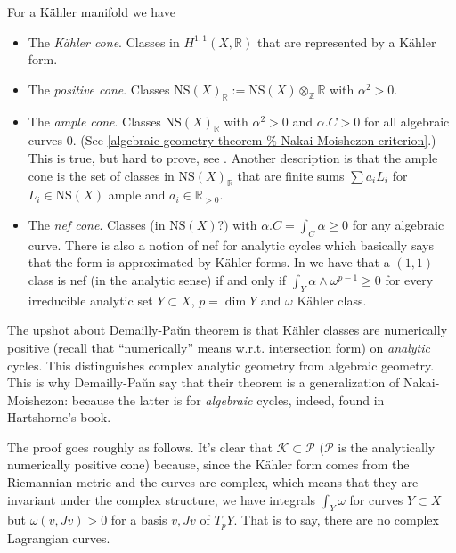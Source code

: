\documentclass{book}
\begin{document}
For a Kähler manifold we have
\begin{itemize}
\item The {\it Kähler cone}. Classes
in $H^{1,1}(X,\mathbb{R})$ that are
represented by a
Kähler form.

\item The {\it positive cone}. Classes
$\text{NS}(X)_\mathbb{R}
:=\text{NS}(X) \otimes_\mathbb{Z}\mathbb{R}$
with $\alpha^2>0$.

\item The {\it ample cone}. Classes
$\text{NS}(X)_\mathbb{R}$
with $\alpha^2>0$ and $\alpha.C>0$ for all
algebraic curves 0.
(See
\ref{algebraic-geometry-theorem-%
Nakai-Moishezon-criterion}.)
This is true, but hard to prove, see
\cite[p. 150]{huk}.
Another description is that the ample cone
is the set of classes in
$\text{NS}(X)_\mathbb{R}$
that are finite sums $\sum a_iL_i$
for $L_i \in \text{NS}(X)$ ample
and $a_i \in \mathbb{R}_{>0}$.

\item The {\it nef cone}. Classes (in
$\text{NS}(X)?)$
with $\alpha.C=\int_C\alpha\geq 0$ for any
algebraic curve.
There is also a notion of nef for analytic
cycles
which basically says that the form is
approximated
by Kähler forms.
In \cite[Theorem 4.7(ii)]{Demailly-Paun} we
have that
a $(1,1)$-class is nef (in the analytic
sense) if and only if
$\int_Y \alpha\wedge\omega^{p-1}\geq 0$ for
every
irreducible analytic set $Y \subset X$,
$p=\dim Y$
and $\bar{\omega}$ Kähler class.

\end{itemize}

\noindent
The upshot about Demailly-Pa\u un theorem
is that Kähler classes are numerically
positive
(recall that ``numerically'' means w.r.t.
intersection form)
on {\it analytic} cycles. This distinguishes
complex analytic geometry from algebraic
geometry.
This is why Demailly-Pa\u un say that
their theorem is a generalization of
Nakai-Moishezon:
because the latter is for {\it algebraic}
cycles,
indeed, found in Hartshorne's book.

The proof goes roughly as follows.
It's clear that $\mathcal{K} \subset
\mathcal{P}$
($\mathcal{P}$ is the analytically
numerically positive cone)
because, since the Kähler form
comes from the Riemannian metric
and the curves are complex,
which means that they are invariant under
the complex structure,
we have integrals
$\int_Y\omega$ for curves $Y \subset X$
but $\omega(v,Jv)>0$ for a basis $v,Jv$
of $T_pY$.
That is to say, there are no complex
Lagrangian curves.
\end{document}
